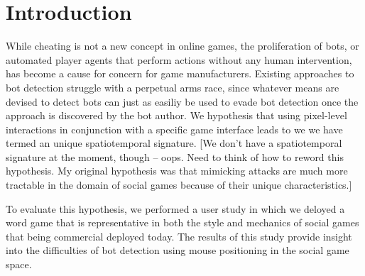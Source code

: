 \documentclass{acm_proc_article-sp}
\begin{document}
\maketitle

\begin{comment}

\begin{abstract}
Bots are a huge problem in online games. Current bot detection approaches they assume that people play differently form humans and that bots have deterministic behavior while actual people do not. Consequently, common approaches include low-level protocol inspection.
\end{abstract}

\category{H.4}{Information Systems Applications}{Miscellaneous}
\category{D.2.8}{Software Engineering}{Metrics}[complexity measures, performance measures]

\terms{Theory}

\keywords{bot detection, social games, mimic attacks, human observational proofs} %

\end{comment}

\section{Introduction}

While cheating is not a new concept in online games, the proliferation of bots, or automated player agents that perform actions without any human intervention, has become a cause for concern for game manufacturers. Existing approaches to bot detection struggle with a perpetual arms race, since whatever means are devised to detect bots can just as easiliy be used to evade bot detection once the approach is discovered by the bot author. We hypothesis that using pixel-level interactions in conjunction with a specific game interface leads to we we have termed an unique spatiotemporal signature. [We don't have a spatiotemporal signature at the moment, though -- oops. Need to think of how to reword this hypothesis. My original hypothesis was that mimicking attacks are much more tractable in the domain of social games because of their unique characteristics.]

To evaluate this hypothesis, we performed a user study in which we deloyed a word game that is representative in both the style and mechanics of social games that being commercial deployed today. The results of this study provide insight into the difficulties of bot detection using mouse positioning in the social game space.
\end{document}
